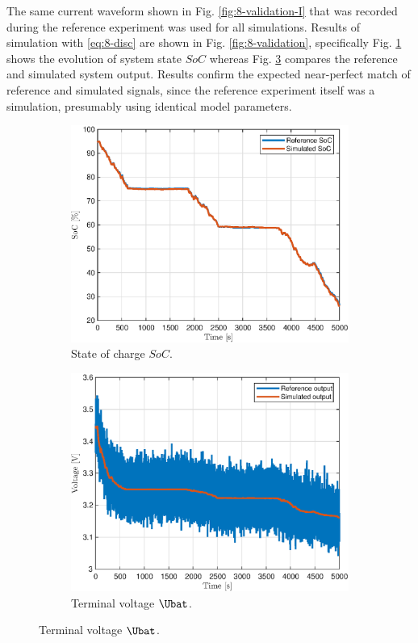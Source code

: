 The same current waveform shown in Fig. \ref{fig:8-validation-I} that was recorded during the reference experiment was used for all simulations. Results of simulation with \eqref{eq:8-disc} are shown in Fig. \ref{fig:8-validation}, specifically Fig. \ref{fig:8-validation-SOC} shows the evolution of system state $SoC$ whereas Fig. \ref{fig:8-validation-U} compares the reference and simulated system output. Results confirm the expected near-perfect match of reference and simulated signals, since the reference experiment itself was a simulation, presumably using identical model parameters.

\begin{figure}[hbp]
    \centering
\begin{subfigure}{0.49\textwidth}
    \centering
    \includegraphics[width=\textwidth]{figures/8/validation-soc.eps}
    \caption{State of charge $SoC$.}
    \label{fig:8-validation-SOC}
    \end{subfigure}
    \hfill
    \begin{subfigure}{0.49\textwidth}
    \centering
    \includegraphics[width=\textwidth]{figures/8/validation-U.eps}
    \caption{Terminal voltage $\Ubat$.}
    \label{fig:8-validation-U}
    \end{subfigure}
    

\end{figure}
